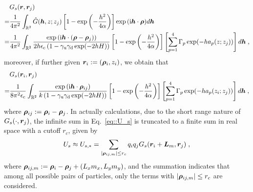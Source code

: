 \begin{align*}
 &G_s(\boldsymbol{r}, \boldsymbol{r}_j)\\
 =&   \frac{1}{4\pi^2}\int_{\mathbb{R}^2} \hat{G}(\boldsymbol{h}, z; z_j)\left[1-\exp\left(-\frac{h^2}{4\alpha}\right)\right]\exp{(\mathrm{i} \boldsymbol{h} \cdot \boldsymbol{\rho})} d \boldsymbol{h}\\
 =& \frac{1}{4\pi^2}\int_{\mathbb{R}^2} \frac{ \exp{(\mathrm{i} \boldsymbol{h} \cdot (\boldsymbol{\rho}-\boldsymbol{\rho}_j))}}{2h\epsilon_{\mathrm{c}}\left(1-\gamma_{\mathrm{u}}\gamma_{\mathrm{d}}\exp(-2hH)\right)} \left[1-\exp\left(-\frac{h^2}{4\alpha}\right)\right]\left[\sum_{p=1}^4\Gamma_p\exp(-ha_p(z;z_j))\right]d \boldsymbol{h}\;,
\end{align*}
moreover, if further given $\boldsymbol{r}_i:=(\bm{\rho}_i, z_i)$, we obtain that 
\begin{align*}
   &G_s(\boldsymbol{r}_i, \boldsymbol{r}_j)\\
   =& \frac{1}{8\pi^2\epsilon_{\mathrm{c}}}\int_{\mathbb{R}^2} \frac{ \exp{(\mathrm{i} \boldsymbol{h} \cdot \boldsymbol{\rho}_{ij})}}{k\left(1-\gamma_{\mathrm{u}}\gamma_{\mathrm{d}}\exp(-2hH)\right)} \left[1-\exp\left(-\frac{h^2}{4\alpha}\right)\right]\left[\sum_{p=1}^4\Gamma_p\exp(-ha_p(z_i;z_j))\right]d \boldsymbol{h}\;,
\end{align*}
where $\boldsymbol{\rho}_{ij}:=\bm{\rho}_i-\bm{\rho}_j$. 
In actually calculations, due to the short range nature of~$G_s(\cdot, \boldsymbol{r}_j)$, the infinite sum in Eq.~\eqref{eq::U_s} is truncated to a finite sum in real space with a cutoff $r_c$, given by
\begin{equation}\label{eq::U_s_truncated}
    U_s \approx U_{s, *} = \sum_{\lvert\bm{\rho}_{ij, m}\rvert \leq r_c} q_i q_j G_s(\boldsymbol{r}_i+\bm{L}_m, \boldsymbol{r}_j)\;,
\end{equation}
where $\bm{\rho}_{ij, m}:=\bm{\rho}_i-\bm{\rho}_j+ (L_x m_x, L_y m_y)$, and the summation indicates that among all possible pairs of particles, only the terms with $\lvert\bm{\rho}_{ij, m}\rvert \leq r_c$ are considered.


